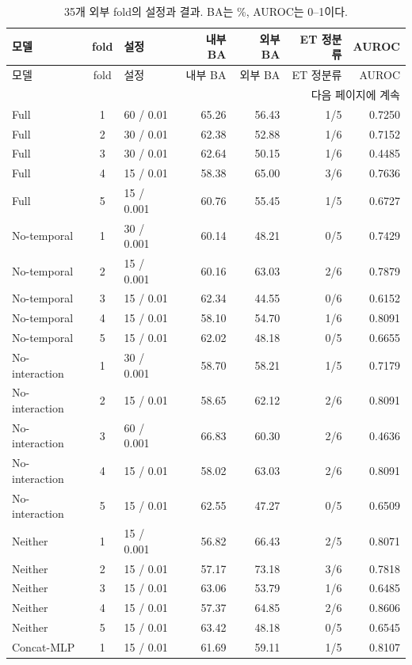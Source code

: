 \documentclass[11pt,a4paper]{article}
\numberwithin{equation}{section}
\begin{document}
\begin{longtable}{@{}lclrrrr@{}}
\caption{35개 외부 fold의 설정과 결과. BA는 \%, AUROC는 0--1이다.}\label{tab:allfolds}\\
\toprule 모델 & fold & 설정 & 내부 BA & 외부 BA & ET 정분류 & AUROC\\\midrule\endfirsthead
\toprule 모델 & fold & 설정 & 내부 BA & 외부 BA & ET 정분류 & AUROC\\\midrule\endhead
\midrule\multicolumn{7}{r}{다음 페이지에 계속}\\\endfoot
\bottomrule\endlastfoot
Full & 1 & 60 / 0.01 & 65.26 & 56.43 & 1/5 & 0.7250 \\
Full & 2 & 30 / 0.01 & 62.38 & 52.88 & 1/6 & 0.7152 \\
Full & 3 & 30 / 0.01 & 62.64 & 50.15 & 1/6 & 0.4485 \\
Full & 4 & 15 / 0.01 & 58.38 & 65.00 & 3/6 & 0.7636 \\
Full & 5 & 15 / 0.001 & 60.76 & 55.45 & 1/5 & 0.6727 \\
No-temporal & 1 & 30 / 0.001 & 60.14 & 48.21 & 0/5 & 0.7429 \\
No-temporal & 2 & 15 / 0.001 & 60.16 & 63.03 & 2/6 & 0.7879 \\
No-temporal & 3 & 15 / 0.01 & 62.34 & 44.55 & 0/6 & 0.6152 \\
No-temporal & 4 & 15 / 0.01 & 58.10 & 54.70 & 1/6 & 0.8091 \\
No-temporal & 5 & 15 / 0.01 & 62.02 & 48.18 & 0/5 & 0.6655 \\
No-interaction & 1 & 30 / 0.001 & 58.70 & 58.21 & 1/5 & 0.7179 \\
No-interaction & 2 & 15 / 0.01 & 58.65 & 62.12 & 2/6 & 0.8091 \\
No-interaction & 3 & 60 / 0.001 & 66.83 & 60.30 & 2/6 & 0.4636 \\
No-interaction & 4 & 15 / 0.01 & 58.02 & 63.03 & 2/6 & 0.8091 \\
No-interaction & 5 & 15 / 0.01 & 62.55 & 47.27 & 0/5 & 0.6509 \\
Neither & 1 & 15 / 0.001 & 56.82 & 66.43 & 2/5 & 0.8071 \\
Neither & 2 & 15 / 0.01 & 57.17 & 73.18 & 3/6 & 0.7818 \\
Neither & 3 & 15 / 0.01 & 63.06 & 53.79 & 1/6 & 0.6485 \\
Neither & 4 & 15 / 0.01 & 57.37 & 64.85 & 2/6 & 0.8606 \\
Neither & 5 & 15 / 0.01 & 63.42 & 48.18 & 0/5 & 0.6545 \\
Concat-MLP & 1 & 15 / 0.01 & 61.69 & 59.11 & 1/5 & 0.8107 \\

\end{longtable}
\end{document}
